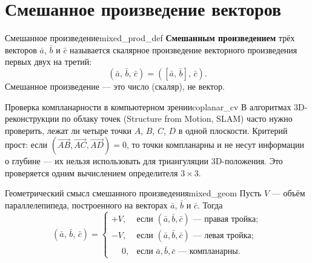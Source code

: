\documentclass[12pt,a4paper]{article}
\newcommand{\va}{\bar{a}}
\newcommand{\vb}{\bar{b}}
\newcommand{\vc}{\bar{c}}
\begin{document}
\section*{Смешанное произведение векторов}

\begin{definition}{Смешанное произведение}{mixed_prod_def}
  \textbf{Смешанным произведением} трёх векторов $\va$, $\vb$ и $\vc$
  называется скалярное произведение векторного произведения первых двух
  на третий:
  \begin{equation}
    (\va,\,\vb,\,\vc) = ([\va,\,\vb],\,\vc). \tag{8.6}
  \end{equation}
  Смешанное произведение --- это число (скаляр), не вектор.
\end{definition}

\begin{remarkIT}{Проверка компланарности в компьютерном зрении}{coplanar_cv}
  В алгоритмах 3D-реконструкции по облаку точек (Structure from Motion,
  SLAM) часто нужно проверить, лежат ли четыре точки $A$, $B$, $C$, $D$
  в одной плоскости. Критерий прост: если
  $(\overrightarrow{AB},\overrightarrow{AC},\overrightarrow{AD})=0$,
  то точки компланарны и не несут информации о глубине --- их нельзя
  использовать для триангуляции 3D-положения. Это проверяется одним
  вычислением определителя $3\times3$.
\end{remarkIT}

\begin{theorem}{Геометрический смысл смешанного произведения}{mixed_geom}
  Пусть $V$ --- объём параллелепипеда, построенного на векторах $\va$,
  $\vb$ и $\vc$. Тогда
  \[
    (\va,\,\vb,\,\vc) =
    \begin{cases}
      +V, & \text{если } (\va,\vb,\vc) \text{ --- правая тройка}; \\
      -V, & \text{если } (\va,\vb,\vc) \text{ --- левая тройка}; \\
      \phantom{+}0,  & \text{если } \va,\vb,\vc \text{ --- компланарны}.
    \end{cases}
  \]
\end{theorem}
\end{document}
